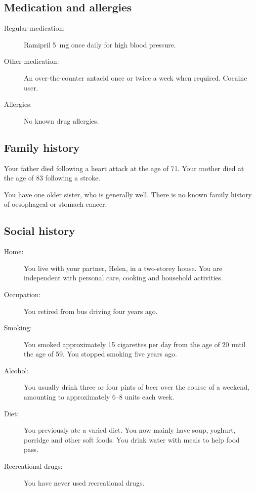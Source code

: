 \subsection*{Medication and allergies}

\begin{description}
    \item[Regular medication:]
    Ramipril \SI{5}{\milli\gram} once daily for high blood pressure.

    \item[Other medication:]
    An over-the-counter antacid once or twice a week when required. Cocaine user.

    \item[Allergies:]
    No known drug allergies.
\end{description}

\subsection*{Family history}

Your father died following a heart attack at the age of 71. Your mother
died at the age of 83 following a stroke.

You have one older sister, who is generally well. There is no known
family history of oesophageal or stomach cancer.

\subsection*{Social history}

\begin{description}
    \item[Home:]
    You live with your partner, Helen, in a two-storey house. You are
    independent with personal care, cooking and household activities.

    \item[Occupation:]
    You retired from bus driving four years ago.

    \item[Smoking:]
    You smoked approximately 15 cigarettes per day from the age of 20
    until the age of 59. You stopped smoking five years ago.

    \item[Alcohol:]
    You usually drink three or four pints of beer over the course of a
    weekend, amounting to approximately 6--8 units each week.

    \item[Diet:]
    You previously ate a varied diet. You now mainly have soup, yoghurt,
    porridge and other soft foods. You drink water with meals to help
    food pass.

    \item[Recreational drugs:]
    You have never used recreational drugs.
\end{description}

